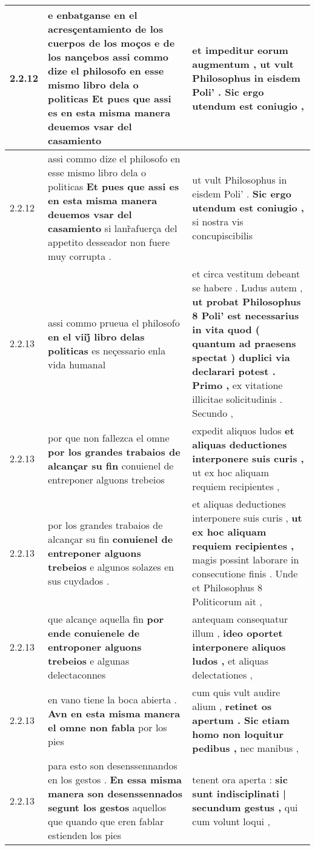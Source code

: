 \begin{tabular}{|p{1cm}|p{6.5cm}|p{6.5cm}|}
2.2.12 & e enbatganse en el acresçentamiento de los cuerpos de los moços e de los nançebos \textbf{ assi commo dize el philosofo en esse mismo libro dela o politicas } Et pues que assi es en esta misma manera deuemos vsar del casamiento & et impeditur eorum augmentum , \textbf{ ut vult Philosophus in eisdem Poli’ . } Sic ergo utendum est coniugio , \\\hline
2.2.12 & assi commo dize el philosofo en esse mismo libro dela o politicas \textbf{ Et pues que assi es en esta misma manera deuemos vsar del casamiento } si lanr̃afuerça del appetito desseador non fuere muy corrupta . & ut vult Philosophus in eisdem Poli’ . \textbf{ Sic ergo utendum est coniugio , } si nostra vis concupiscibilis \\\hline
2.2.13 & assi commo prueua el philosofo \textbf{ en el viij̊ libro delas politicas } es neçessario enla vida humanal & et circa vestitum debeant se habere . Ludus autem , \textbf{ ut probat Philosophus 8 Poli’ est necessarius in vita quod ( quantum ad praesens spectat ) duplici via declarari potest . Primo , } ex vitatione illicitae solicitudinis . Secundo , \\\hline
2.2.13 & por que non fallezca el omne \textbf{ por los grandes trabaios de alcançar su fin } conuienel de entreponer alguons trebeios & expedit aliquos ludos \textbf{ et aliquas deductiones interponere suis curis , } ut ex hoc aliquam requiem recipientes , \\\hline
2.2.13 & por los grandes trabaios de alcançar su fin \textbf{ conuienel de entreponer alguons trebeios } e algunos solazes en sus cuydados . & et aliquas deductiones interponere suis curis , \textbf{ ut ex hoc aliquam requiem recipientes , } magis possint laborare in consecutione finis . Unde et Philosophus 8 Politicorum ait , \\\hline
2.2.13 & que alcançe aquella fin \textbf{ por ende conuienele de entroponer alguons trebeios } e algunas delectaconnes & antequam consequatur illum , \textbf{ ideo oportet interponere aliquos ludos , } et aliquas delectationes , \\\hline
2.2.13 & en vano tiene la boca abierta . \textbf{ Avn en esta misma manera el omne non fabla } por los pies & cum quis vult audire alium , \textbf{ retinet os apertum . Sic etiam homo non loquitur pedibus , } nec manibus , \\\hline
2.2.13 & para esto son desenssennandos en los gestos . \textbf{ En essa misma manera son desenssennados segunt los gestos } aquellos que quando que eren fablar estienden los pies & tenent ora aperta : \textbf{ sic sunt indisciplinati | secundum gestus , } qui cum volunt loqui , \\\hline

\end{tabular}
